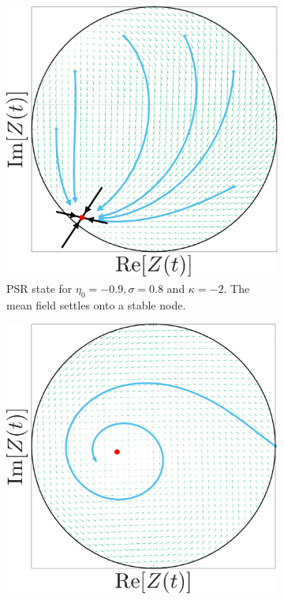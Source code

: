 \begin{figure}[H]
\centering
\begin{subfigure}[b]{0.32\linewidth}
   \centering
  \includegraphics[width=\linewidth]{../Figures/PhaseSpace/MFRPSR.pdf}
   \caption{PSR state for $\eta_0 = -0.9, \sigma = 0.8$ and $\kappa= -2$. The mean field settles onto a stable node.}
   \label{fig:MFRPSR} 
\end{subfigure} \hfill
\begin{subfigure}[b]{0.32\linewidth}
   \centering
  \includegraphics[width=\linewidth]{../Figures/PhaseSpace/MFRPSS.pdf}

\end{subfigure}
\end{figure}
